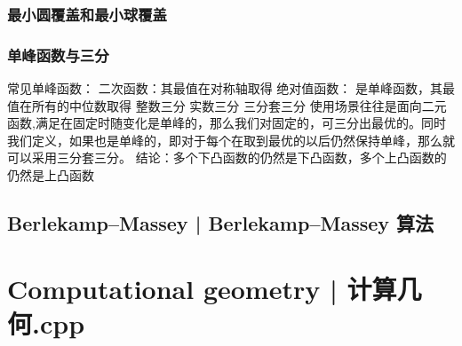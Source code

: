 \documentclass[8pt,a4paper]{article}
\newcommand{\code}[1]{
    
}
\newcommand{\txt}[1]{\par\noindent\footnotesize #1}
\newcommand{\inlineformula}[1]{\ensuremath{}}
\begin{document}
\begin{multicols}{2}
        \subsubsection{最小圆覆盖和最小球覆盖}
            \code{src/number_theory/随机化算法_18_5.cpp}
        \subsubsection{单峰函数与三分}
            \txt{常见单峰函数：
二次函数：其最值在对称轴取得
绝对值函数：
\inlineformula{./assets/formulas_tex/formula_672.tex}是单峰函数，其最值在所有\inlineformula{./assets/formulas_tex/formula_673.tex}的中位数取得
整数三分
实数三分
三分套三分
使用场景往往是面向二元函数\inlineformula{./assets/formulas_tex/formula_674.tex},满足在固定\inlineformula{./assets/formulas_tex/formula_675.tex}时\inlineformula{./assets/formulas_tex/formula_676.tex}随\inlineformula{./assets/formulas_tex/formula_677.tex}变化是单峰的，那么我们对固定的\inlineformula{./assets/formulas_tex/formula_678.tex}，可三分出最优的\inlineformula{./assets/formulas_tex/formula_679.tex}。同时我们定义\inlineformula{./assets/formulas_tex/formula_680.tex}，如果\inlineformula{./assets/formulas_tex/formula_681.tex}也是单峰的，即对于每个\inlineformula{./assets/formulas_tex/formula_682.tex}在取到最优的\inlineformula{./assets/formulas_tex/formula_683.tex}以后仍然保持单峰，那么就可以采用三分套三分。
结论：多个下凸函数的\inlineformula{./assets/formulas_tex/formula_684.tex}仍然是下凸函数，多个上凸函数的\inlineformula{./assets/formulas_tex/formula_685.tex}仍然是上凸函数}
            \code{src/number_theory/随机化算法_20_5.cpp}

    \subsection{Berlekamp–Massey | Berlekamp–Massey 算法}
        \makeatletter
        \let\oldaddcontentsline\addcontentsline
        \renewcommand{\addcontentsline}[3]{%
            \ifnum\pdfstrcmp{#1}{toc}=0%
                \ifnum\pdfstrcmp{#2}{subsubsection}=0%
                \else
                    \oldaddcontentsline{#1}{#2}{#3}%
                \fi
            \else
                \oldaddcontentsline{#1}{#2}{#3}%
            \fi
        }
        \let\addcontentsline\oldaddcontentsline
        \makeatother

\section{Computational geometry | 计算几何.cpp}

\end{multicols}
\end{document}
